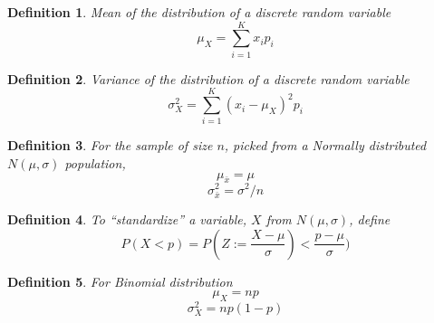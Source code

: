 \documentclass{article}
\newtheorem*{definition}{Definition}
\begin{document}
\begin{definition} Mean of the distribution of a discrete random variable 
  $$\mu_X=\sum_{i=1}^K{x_ip_i}$$
\end{definition}

\begin{definition} Variance of the distribution of a discrete random variable 
  $$\sigma_X^2=\sum_{i=1}^K{(x_i-\mu_X)^2p_i}$$
\end{definition}

\begin{definition} For the sample of size $n$, picked from
  a Normally distributed $N(\mu,\sigma)$ population,
  $$\mu_{\bar{x}}=\mu$$
  $$\sigma_{\bar{x}}^2=\sigma^2/n$$
\end{definition}

\begin{definition} To ``standardize'' a variable, $X$ from $N(\mu,\sigma)$, define
  $$P(X<p)=P(Z:=\frac{X-\mu}{\sigma})<\frac{p-\mu}{\sigma})$$
\end{definition}

\begin{definition} For Binomial distribution
  $$\mu_X=np$$
  $$\sigma_X^2=np(1-p)$$
\end{definition}
\end{document}
